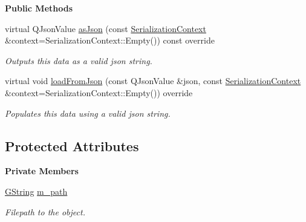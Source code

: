 \begin{Indent}\textbf{ Public Methods}\par
\begin{DoxyCompactItemize}
\item 
\mbox{\label{classrev_1_1_loadable_a465ea3cb3d278ea34575e7809b594fa6}} 
virtual Q\+Json\+Value \mbox{\hyperlink{classrev_1_1_loadable_a465ea3cb3d278ea34575e7809b594fa6}{as\+Json}} (const \mbox{\hyperlink{structrev_1_1_serialization_context}{Serialization\+Context}} \&context=Serialization\+Context\+::\+Empty()) const override
\begin{DoxyCompactList}\small\item\em Outputs this data as a valid json string. \end{DoxyCompactList}\item 
\mbox{\label{classrev_1_1_loadable_a35b1315688cc8910c15f5b6165a99efc}} 
virtual void \mbox{\hyperlink{classrev_1_1_loadable_a35b1315688cc8910c15f5b6165a99efc}{load\+From\+Json}} (const Q\+Json\+Value \&json, const \mbox{\hyperlink{structrev_1_1_serialization_context}{Serialization\+Context}} \&context=Serialization\+Context\+::\+Empty()) override
\begin{DoxyCompactList}\small\item\em Populates this data using a valid json string. \end{DoxyCompactList}\end{DoxyCompactItemize}
\end{Indent}
\subsection*{Protected Attributes}
\begin{Indent}\textbf{ Private Members}\par
\begin{DoxyCompactItemize}
\item 
\mbox{\label{classrev_1_1_loadable_a097470bcd420656515053dd0b5a6a49f}} 
\mbox{\hyperlink{classrev_1_1_g_string}{G\+String}} \mbox{\hyperlink{classrev_1_1_loadable_a097470bcd420656515053dd0b5a6a49f}{m\+\_\+path}}
\begin{DoxyCompactList}\small\item\em Filepath to the object. \end{DoxyCompactList}\end{DoxyCompactItemize}
\end{Indent}

